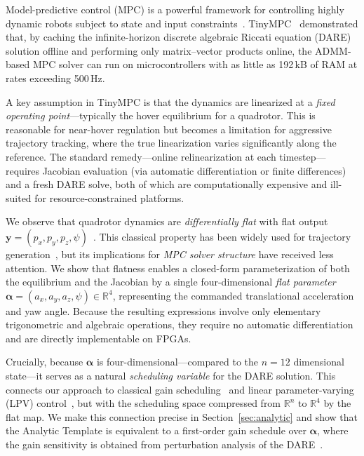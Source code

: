 \documentclass[letterpaper, 10pt, conference]{IEEEtran}
\newcommand{\R}{\mathbb{R}}
\newcommand{\balpha}{\bm{\alpha}}
\newcommand{\by}{\bm{y}}
\begin{document}
Model-predictive control (MPC) is a powerful framework for controlling
highly dynamic robots subject to state and input constraints~\cite{tinympc}.
TinyMPC~\cite{tinympc} demonstrated that, by caching the
infinite-horizon discrete algebraic Riccati equation (DARE) solution
offline and performing only matrix--vector products online,
the ADMM-based MPC solver can run on microcontrollers with as little
as 192\,kB of RAM at rates exceeding 500\,Hz.

A key assumption in TinyMPC is that the dynamics are linearized
at a \emph{fixed operating point}---typically the hover equilibrium
for a quadrotor.
This is reasonable for near-hover regulation but becomes a limitation
for aggressive trajectory tracking, where the true linearization
varies significantly along the reference.
The standard remedy---online relinearization at each timestep---requires
Jacobian evaluation (via automatic differentiation or finite differences)
and a fresh DARE solve, both of which are computationally expensive
and ill-suited for resource-constrained platforms.

We observe that quadrotor dynamics are \emph{differentially flat}
with flat output $\by = (p_x, p_y, p_z, \psi)$~\cite{mellinger2011,murray1995}.
This classical property has been widely used for trajectory
generation~\cite{mellinger2011,mueller2015}, but its implications
for \emph{MPC solver structure} have received less attention.
We show that flatness enables a closed-form parameterization of
both the equilibrium and the Jacobian by a single four-dimensional
\emph{flat parameter}
$\balpha = (a_x, a_y, a_z, \psi) \in \R^4$,
representing the commanded translational acceleration and yaw angle.
Because the resulting expressions involve only elementary trigonometric
and algebraic operations, they require no automatic differentiation
and are directly implementable on FPGAs.

Crucially, because $\balpha$ is four-dimensional---compared to the
$n=12$ dimensional state---it serves as a natural
\emph{scheduling variable} for the DARE solution.
This connects our approach to classical gain scheduling~\cite{rugh2000}
and linear parameter-varying (LPV) control~\cite{shamma1991},
but with the scheduling space compressed from $\R^n$ to $\R^4$
by the flat map.
We make this connection precise in Section~\ref{sec:analytic}
and show that the Analytic Template is equivalent to
a first-order gain schedule over $\balpha$, where the gain
sensitivity is obtained from perturbation analysis of the
DARE~\cite{hewer1971,konstantinov1993}.
\end{document}
